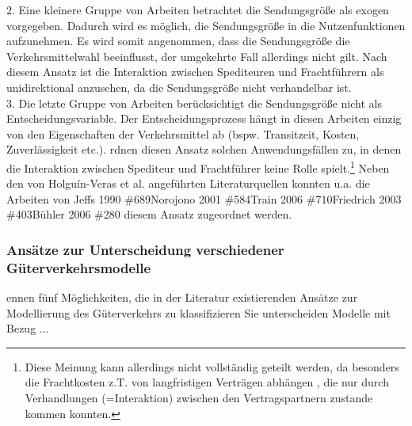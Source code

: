 2. Eine kleinere Gruppe von Arbeiten betrachtet die Sendungsgröße als exogen vorgegeben. Dadurch wird es möglich, die Sendungsgröße in die Nutzenfunktionen aufzunehmen. Es wird somit angenommen, dass die Sendungsgröße die Verkehrsmittelwahl beeinflusst, der umgekehrte Fall allerdings nicht gilt. Nach diesem Ansatz ist die Interaktion zwischen Spediteuren und Frachtführern als unidirektional anzusehen, da die Sendungsgröße nicht verhandelbar ist.~\\
3. Die letzte Gruppe von Arbeiten berücksichtigt die Sendungsgröße nicht als Entscheidungsvariable. Der Entscheidungsprozess hängt in diesen Arbeiten einzig von den Eigenschaften der Verkehrsmittel ab (bspw. Transitzeit, Kosten, Zuverlässigkeit etc.).  \citeauthor{bib.707} rdnen diesen Ansatz solchen Anwendungsfällen zu, in denen die Interaktion zwischen Spediteur und Frachtführer keine Rolle spielt.\footnote{%
 Diese Meinung kann allerdings nicht vollständig geteilt werden, da besonders die Frachtkosten z.T. von langfristigen Verträgen abhängen  \autocites[][]{bib.268}, die nur durch Verhandlungen (=Interaktion) zwischen den Vertragspartnern zustande kommen konnten.
}%
 Neben den von Holguín-Veras et al. angeführten Literaturquellen konnten u.a. die Arbeiten von {Jeffs 1990 \#689}{Norojono 2001 \#584}{Train 2006 \#710}{Friedrich 2003 \#403}{Bühler 2006 \#280} diesem Ansatz zugeordnet werden.~\\


% 
\subsubsection{Ansätze zur Unterscheidung verschiedener Güterverkehrsmodelle}
\label{_Toc366766087}
\label{_Toc366775281}
 \citeauthor{bib.876} ennen fünf Möglichkeiten, die in der Literatur existierenden Ansätze zur Modellierung des Güterverkehrs zu klassifizieren  \autocites[][]{bib.876} Sie unterscheiden Modelle mit Bezug $\ldots$~\\

